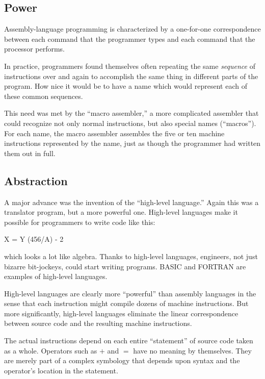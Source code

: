 \subsection{Power}
Assembly-language
programming is characterized by a one-for-one correspondence
between each command that the programmer types and each command that
the processor performs.

In practice, programmers found themselves often repeating the same
\emph{sequence} of instructions over and again to accomplish the same
thing in different parts of the program.  How nice it would be to have
a name which would represent each of these common sequences.

This need was met by the ``macro assembler,''%
a more complicated assembler that could recognize not only normal
instructions, but also special names (``macros''). For each name, the
macro assembler assembles the five or ten machine instructions
represented by the name, just as though the programmer had written
them out in full.


\subsection{Abstraction}%
%
A major advance was the invention of the ``high-level language.''%
Again this was a translator program, but a more powerful%
 one. High-level
languages make it possible for programmers to write code like this:
\begin{Code}
X = Y (456/A) - 2
\end{Code}
which looks a lot like algebra. Thanks to high-level languages,
engineers, not just bizarre bit-jockeys, could start writing programs.
BASIC and FORTRAN are examples of
high-level languages.

High-level languages are clearly more ``powerful'' than
assembly languages
in the sense that each instruction might compile dozens of machine
instructions. But more significantly, high-level languages eliminate
the linear correspondence between source code and the resulting
machine instructions.

The actual instructions depend on each entire ``statement'' of
source code taken as a whole. Operators such as
$+$ and $=$ have no meaning
by themselves. They are merely part of a complex symbology that depends
upon syntax and the operator's location in the statement.

